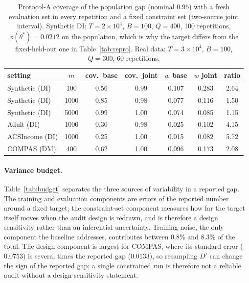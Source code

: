 \documentclass[11pt]{article}
\newcommand{\Dp}{D'}
\begin{document}
\begin{table}[t]
\centering
\small
\setlength{\tabcolsep}{4pt}
\caption{Protocol-A coverage of the population gap (nominal $0.95$) with a fresh evaluation set in
every repetition and a fixed constraint set (two-source joint interval).  Synthetic DI: $T=2\times10^4$, $B=100$, $Q=400$, 100 repetitions, $\phi(\theta^*)=0.0212$ on the population, which is why the target differs from the fixed-held-out one in Table~\ref{tab:repro}.  Real data: $T=3\times10^4$, $B=100$, $Q=300$, 60 repetitions.}
\label{tab:protocolA}
\begin{tabular}{lcccccc}
\toprule
setting & $m$ & cov.\ base & cov.\ joint & $w$ base & $w$ joint & ratio \\
\midrule
Synthetic (DI) & 100  & 0.56 & 0.99 & 0.107 & 0.283 & 2.64 \\
Synthetic (DI) & 1000 & 0.85 & 0.98 & 0.077 & 0.116 & 1.50 \\
Synthetic (DI) & 5000 & 0.99 & 1.00 & 0.074 & 0.085 & 1.15 \\
Adult (DI)     & 1000 & 0.30 & 0.98 & 0.025 & 0.102 & 4.15 \\
ACSIncome (DI) & 1000 & 0.25 & 1.00 & 0.015 & 0.082 & 5.72 \\
COMPAS (DM)    & 400  & 0.62 & 1.00 & 0.096 & 0.173 & 2.08 \\
\bottomrule
\end{tabular}
\end{table}

\paragraph{Variance budget.}
Table~\ref{tab:budget} separates the three sources of variability in a reported gap.  The training
and evaluation components are errors of the reported number around a fixed target; the
constraint-set component measures how far the target itself moves when the audit design is redrawn,
and is therefore a design sensitivity rather than an inferential uncertainty.  Training noise, the only component the baseline addresses, contributes between $0.8\%$ and $8.3\%$ of
the total.  The design component is largest for COMPAS, where its standard error ($0.0753$) is several times the reported gap ($0.0133$), so resampling $\Dp$ can change the sign of the reported gap; a single constrained run is therefore not a reliable audit without a design-sensitivity statement.
\end{document}
